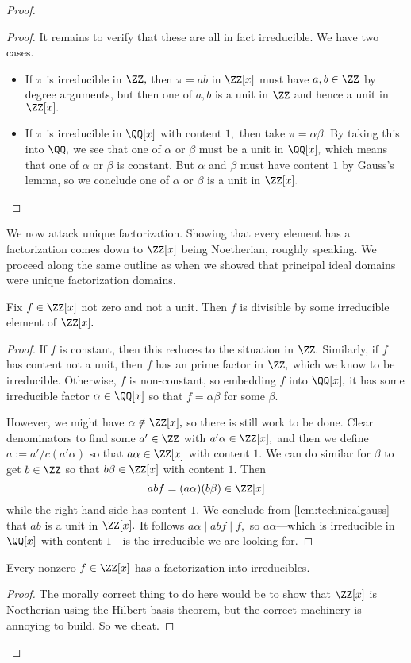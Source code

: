 \documentclass[../notes.tex]{subfiles}
\begin{document}
\begin{proof}
\begin{proof}
		It remains to verify that these are all in fact irreducible. We have two cases.
		\begin{itemize}
			\item If $\pi$ is irreducible in $\ZZ,$ then $\pi=ab$ in $\ZZ[x]$ must have $a,b\in\ZZ$ by degree arguments, but then one of $a,b$ is a unit in $\ZZ$ and hence a unit in $\ZZ[x].$
			\item If $\pi$ is irreducible in $\QQ[x]$ with content $1,$ then take $\pi=\alpha\beta.$ By taking this into $\QQ,$ we see that one of $\alpha$ or $\beta$ must be a unit in $\QQ[x],$ which means that one of $\alpha$ or $\beta$ is constant. But $\alpha$ and $\beta$ must have content $1$ by Gauss's lemma, so we conclude one of $\alpha$ or $\beta$ is a unit in $\ZZ[x].$
			\qedhere
		\end{itemize}
	\end{proof}
	We now attack unique factorization. Showing that every element has a factorization comes down to $\ZZ[x]$ being Noetherian, roughly speaking. We proceed along the same outline as when we showed that principal ideal domains were unique factorization domains.
	\begin{lemma}
		Fix $f\in\ZZ[x]$ not zero and not a unit. Then $f$ is divisible by some irreducible element of $\ZZ[x].$
	\end{lemma}
	\begin{proof}
		If $f$ is constant, then this reduces to the situation in $\ZZ.$ Similarly, if $f$ has content not a unit, then $f$ has an prime factor in $\ZZ,$ which we know to be irreducible. Otherwise, $f$ is non-constant, so embedding $f$ into $\QQ[x],$ it has some irreducible factor $\alpha\in\QQ[x]$ so that $f=\alpha\beta$ for some $\beta.$
		
		However, we might have $\alpha\notin\ZZ[x],$ so there is still work to be done. Clear denominators to find some $a'\in\ZZ$ with $a'\alpha\in\ZZ[x],$ and then we define $a:=a'/c(a'\alpha)$ so that $a\alpha\in\ZZ[x]$ with content $1.$ We can do similar for $\beta$ to get $b\in\ZZ$ so that $b\beta\in\ZZ[x]$ with content $1.$ Then
		\[abf=(a\alpha)(b\beta)\in\ZZ[x]\]
		while the right-hand side has content $1.$ We conclude from \autoref{lem:technicalgauss} that $ab$ is a unit in $\ZZ[x].$ It follows $a\alpha\mid abf\mid f,$ so $a\alpha$---which is irreducible in $\QQ[x]$ with content $1$---is the irreducible we are looking for.
	\end{proof}
	\begin{lemma}
		Every nonzero $f\in\ZZ[x]$ has a factorization into irreducibles.
	\end{lemma}
	\begin{proof}
		The morally correct thing to do here would be to show that $\ZZ[x]$ is Noetherian using the Hilbert basis theorem, but the correct machinery is annoying to build. So we cheat.


\end{proof}
\end{proof}
\end{document}
